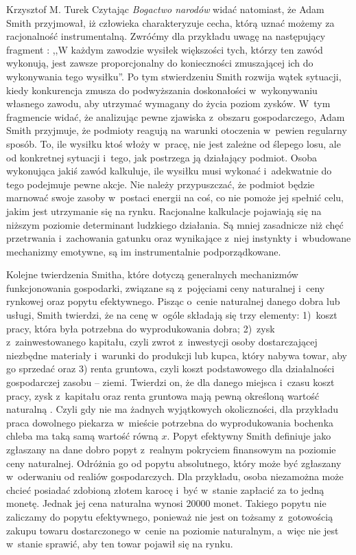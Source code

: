 \begin{artplenv}{Krzysztof M. Turek}
Czytając \textit{Bogactwo narodów} widać natomiast, że Adam Smith przyjmował,
iż człowieka charakteryzuje cecha, którą uznać możemy za racjonalność instrumentalną. Zwróćmy dla przykładu uwagę na
następujący fragment
\parencite[s.~423]{smith_badania_2007}:
,,W każdym zawodzie wysiłek większości tych, którzy
ten zawód wykonują, jest zawsze proporcjonalny do konieczności zmuszającej ich do wykonywania tego wysiłku''. Po tym
stwierdzeniu Smith rozwija wątek sytuacji, kiedy konkurencja zmusza do podwyższania doskonałości w~wykonywaniu własnego
zawodu, aby utrzymać wymagany do życia poziom zysków. W~tym fragmencie widać, że analizując pewne zjawiska z~obszaru
gospodarczego, Adam Smith przyjmuje, że podmioty reagują na warunki otoczenia w~pewien regularny sposób. To, ile
wysiłku ktoś włoży w~pracę, nie jest zależne od ślepego losu, ale od konkretnej sytuacji i~tego, jak postrzega ją
działający podmiot. Osoba wykonująca jakiś zawód kalkuluje, ile wysiłku musi wykonać i~adekwatnie do tego podejmuje
pewne akcje. Nie należy przypuszczać, że podmiot będzie marnować swoje zasoby w~postaci energii na coś, co nie pomoże
jej spełnić celu, jakim jest utrzymanie się na rynku. Racjonalne kalkulacje pojawiają się na niższym poziomie
determinant ludzkiego działania. Są mniej zasadnicze niż chęć przetrwania i~zachowania gatunku oraz wynikające z~niej
instynkty i~wbudowane mechanizmy emotywne, są im instrumentalnie podporządkowane.

Kolejne twierdzenia Smitha, które dotyczą generalnych mechanizmów funkcjonowania gospodarki, związane są z~pojęciami
ceny naturalnej i~ceny rynkowej oraz popytu efektywnego. Pisząc o~cenie naturalnej danego dobra lub usługi, Smith
twierdzi, że na cenę w~ogóle składają się trzy elementy: 1)~koszt pracy, która była potrzebna do wyprodukowania dobra;
2)~zysk z~zainwestowanego kapitału, czyli zwrot z~inwestycji osoby dostarczającej niezbędne materiały i~warunki do
produkcji lub kupca, który nabywa towar, aby go sprzedać oraz 3) renta gruntowa, czyli koszt podstawowego dla
działalności gospodarczej zasobu -- ziemi. Twierdzi on, że dla danego miejsca i~czasu koszt pracy, zysk z~kapitału
oraz renta gruntowa mają pewną określoną wartość naturalną
\parencite[s.~66]{smith_badania_2007}.
Czyli gdy
nie ma żadnych wyjątkowych okoliczności, dla przykładu praca dowolnego piekarza w~mieście potrzebna do wyprodukowania
bochenka chleba ma taką samą wartość równą $x$. Popyt efektywny Smith definiuje jako zgłaszany na dane dobro
popyt z~realnym pokryciem finansowym na poziomie ceny naturalnej. Odróżnia go od popytu absolutnego, który może być
zgłaszany w~oderwaniu od realiów gospodarczych. Dla przykładu, osoba niezamożna może chcieć posiadać zdobioną złotem
karocę i~być w~stanie zapłacić za to jedną monetę. Jednak jej cena naturalna wynosi 20000 monet. Takiego popytu nie
zaliczamy do popytu efektywnego, ponieważ nie jest on tożsamy z~gotowością zakupu towaru dostarczonego w~cenie na
poziomie naturalnym, a~więc nie jest w~stanie sprawić, aby ten towar pojawił się na rynku.


\end{artplenv}

